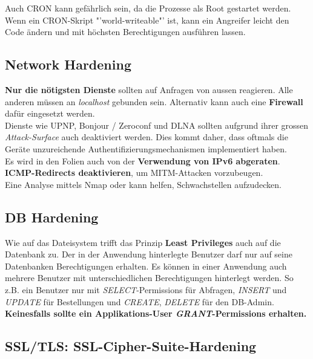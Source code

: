 Auch CRON kann gefährlich sein, da die Prozesse als Root gestartet werden. Wenn ein CRON-Skript "'world-writeable"' ist, kann ein Angreifer leicht den Code ändern und mit höchsten Berechtigungen ausführen lassen.

\subsection{Network Hardening}
\textbf{Nur die nötigsten Dienste} sollten auf Anfragen von aussen reagieren. Alle anderen müssen an \textit{localhost} gebunden sein. Alternativ kann auch eine \textbf{Firewall} dafür eingesetzt werden.\\
Dienste wie UPNP, Bonjour / Zeroconf und DLNA sollten aufgrund ihrer grossen \textit{Attack-Surface} auch deaktiviert werden. Dies kommt daher, dass oftmals die Geräte unzureichende Authentifizierungsmechanismen implementiert haben.\\

Es wird in den Folien auch von der \textbf{Verwendung von IPv6 abgeraten}.\\

\textbf{ICMP-Redirects deaktivieren}, um MITM-Attacken vorzubeugen.\\

Eine Analyse mittels Nmap oder  kann helfen, Schwachstellen aufzudecken.

\subsection{DB Hardening}
Wie auf das Dateisystem trifft das Prinzip \textbf{Least Privileges} auch auf die Datenbank zu. Der in der Anwendung hinterlegte Benutzer darf nur auf seine Datenbanken Berechtigungen erhalten. Es können in einer Anwendung auch mehrere Benutzer mit unterschiedlichen Berechtigungen hinterlegt werden. So z.B. ein Benutzer nur mit \textit{SELECT}-Permissions für Abfragen, \textit{INSERT} und \textit{UPDATE} für Bestellungen und \textit{CREATE}, \textit{DELETE} für den DB-Admin.\\

\textbf{Keinesfalls sollte ein Applikations-User \textit{GRANT}-Permissions erhalten.}

\subsection{SSL/TLS: SSL-Cipher-Suite-Hardening}

